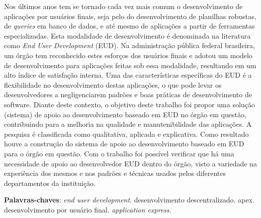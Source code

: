 \begin{resumo}

Nos últimos anos tem se tornado cada vez mais comum o desenvolvimento de aplicações por usuários finais, seja pelo do desenvolvimento de planilhas robustas, de \textit{queries} em banco de dados, e até mesmo de aplicações a partir de ferramentas especializadas. Esta modalidade de desenvolvimento é denominada na literatura como \textit{End User Development} (EUD). Na administração pública federal brasileira, um órgão tem reconhecido estes esforços dos usuários finais e adotou um modelo de desenvolvimento para aplicações feitas sob essa modalidade, resultando em um alto índice de satisfação interna. Uma das características específicas do EUD é a flexibilidade no desenvolvimento destas aplicações, o que pode levar os desenvolvedores a negligenciarem padrões e boas práticas de desenvolvimento de software. Diante deste contexto, o objetivo deste trabalho foi propor uma solução (sistema) de apoio ao desenvolvimento baseado em EUD no órgão em questão, contribuindo para a melhoria na qualidade e manutenibilidade das aplicações. A pesquisa é classificada como qualitativa, aplicada e explicativa. Como resultado houve a construção do sistema de apoio ao desenvolvimento baseado em EUD para o órgão em questão. Com o trabalho foi possível verificar que há uma necessidade de apoio ao desenvolvedor EUD dentro do órgão, visto a variedade na experiência dos mesmos e nos padrões e técnicas usados pelos diferentes departamentos da instituição.




 \vspace{\onelineskip}
    
 \noindent
 \textbf{Palavras-chaves}: \textit{end user development}. desenvolvimento descentralizado. apex. desenvolvimento por usuário final. \textit{application express}.
\end{resumo}
